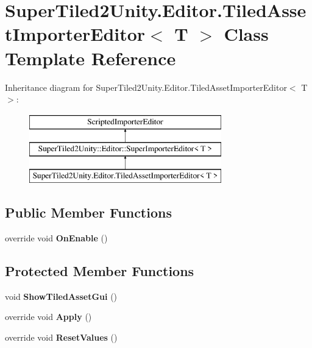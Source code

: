 \hypertarget{class_super_tiled2_unity_1_1_editor_1_1_tiled_asset_importer_editor}{}\section{Super\+Tiled2\+Unity.\+Editor.\+Tiled\+Asset\+Importer\+Editor$<$ T $>$ Class Template Reference}
\label{class_super_tiled2_unity_1_1_editor_1_1_tiled_asset_importer_editor}
Inheritance diagram for Super\+Tiled2\+Unity.\+Editor.\+Tiled\+Asset\+Importer\+Editor$<$ T $>$\+:\begin{figure}[H]
\begin{center}
\leavevmode
\includegraphics[height=3.000000cm]{class_super_tiled2_unity_1_1_editor_1_1_tiled_asset_importer_editor}
\end{center}
\end{figure}
\subsection*{Public Member Functions}
\begin{DoxyCompactItemize}
\item 
\mbox{\label{class_super_tiled2_unity_1_1_editor_1_1_tiled_asset_importer_editor_aae2b7609f64fba7c66e93995d2195cbc}} 
override void {\bfseries On\+Enable} ()
\end{DoxyCompactItemize}
\subsection*{Protected Member Functions}
\begin{DoxyCompactItemize}
\item 
\mbox{\label{class_super_tiled2_unity_1_1_editor_1_1_tiled_asset_importer_editor_a56fb0e204d88b1ad3f8cc0bfc8f831bf}} 
void {\bfseries Show\+Tiled\+Asset\+Gui} ()
\item 
\mbox{\label{class_super_tiled2_unity_1_1_editor_1_1_tiled_asset_importer_editor_ac1476904a4f135d7cb700ecddd6e2da9}} 
override void {\bfseries Apply} ()
\item 
\mbox{\label{class_super_tiled2_unity_1_1_editor_1_1_tiled_asset_importer_editor_a618ca328b2a65f14945bc68e4c3d1fe9}} 
override void {\bfseries Reset\+Values} ()
\end{DoxyCompactItemize}
